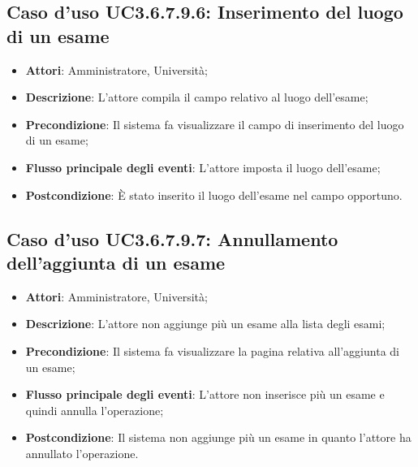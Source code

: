 \subsection{Caso d'uso \texorpdfstring{UC3.6.7.9.6}{UC3.6.7.9.6}: Inserimento del luogo di un esame}
\begin{itemize}
	\item \textbf{Attori}: Amministratore, Università;
	\item \textbf{Descrizione}: L'attore compila il campo relativo al luogo dell’esame;
	
	\item \textbf{Precondizione}: Il sistema fa visualizzare il campo di inserimento del luogo di un esame;
	
	\item \textbf{Flusso principale degli eventi}: L'attore imposta il luogo dell’esame;
	
	\item \textbf{Postcondizione}: È stato inserito il luogo dell'esame nel campo opportuno.
	
\end{itemize}
\subsection{Caso d'uso \texorpdfstring{UC3.6.7.9.7}{UC3.6.7.9.7}: Annullamento dell’aggiunta di un esame}
\begin{itemize}
	\item \textbf{Attori}: Amministratore, Università;
	\item \textbf{Descrizione}: L'attore non aggiunge più un esame alla lista degli esami;
	
	\item \textbf{Precondizione}: Il sistema fa visualizzare la pagina relativa all'aggiunta di un esame;
	
	\item \textbf{Flusso principale degli eventi}: L'attore non inserisce più un esame e quindi annulla l'operazione;
	
	\item \textbf{Postcondizione}: Il sistema non aggiunge più un esame in quanto l'attore ha annullato l'operazione.
\end{itemize}
